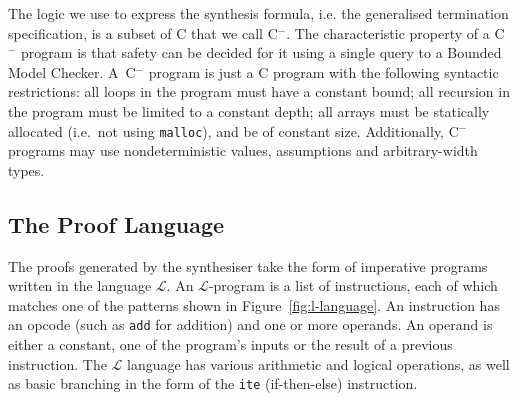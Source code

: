 \documentclass[preprint]{sigplanconf}
\theoremstyle{definition}
\newcommand{\todo}[1]{{\bf TODO:} #1}
\newcommand{\newC}{C$^-$\xspace}
\begin{document}
The logic we use to express the synthesis formula, i.e.
the generalised termination specification, is a subset of C that we call
\newC.  The characteristic property of a \newC program is that safety can be
decided for it using a single query to a Bounded Model Checker.  A~\newC
program is just a C program with the following syntactic restrictions:
 all loops in the program must have a constant bound;
 all recursion in the program must be limited to a constant depth;
 all arrays must be statically allocated (i.e.~not using \texttt{malloc}),
 and be of constant size.
Additionally, \newC programs may use nondeterministic values, assumptions
and arbitrary-width types.

\subsection{The Proof Language}

The proofs generated by the synthesiser take the form of imperative programs
written in the language $\mathcal{L}$.  An $\mathcal{L}$-program is a list
of instructions, each of which matches one of the patterns shown in
Figure~\ref{fig:l-language}.  An instruction has an opcode (such as
\verb|add| for addition) and one or more operands.  An operand is either a
constant, one of the program's inputs or the result of a previous
instruction.  The $\mathcal{L}$ language has various arithmetic and logical
operations, as well as basic branching in the form of the \verb|ite|
(if-then-else) instruction.

\end{document}
